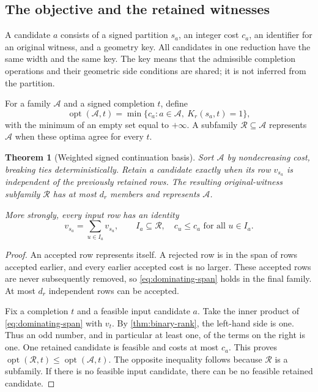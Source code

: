\documentclass[11pt,letterpaper]{article}
\newtheorem{theorem}{Theorem}[section]
\theoremstyle{definition}
\newcommand{\Opt}{\operatorname{opt}}
\begin{document}
\subsection{The objective and the retained witnesses}
A candidate $a$ consists of a signed partition $s_a$, an integer cost $c_a$, an identifier for an original witness, and a geometry key. All candidates in one reduction have the same width and the same key. The key means that the admissible completion operations and their geometric side conditions are shared; it is not inferred from the partition.

For a family $\mathcal A$ and a signed completion $t$, define
\[
 \Opt(\mathcal A,t)=\min\{c_a:a\in\mathcal A,\ K_r(s_a,t)=1\},
\]
with the minimum of an empty set equal to $+\infty$. A subfamily $\mathcal R\subseteq\mathcal A$ represents $\mathcal A$ when these optima agree for every $t$.

\begin{theorem}[Weighted signed continuation basis]\label{thm:weighted}
Sort $\mathcal A$ by nondecreasing cost, breaking ties deterministically. Retain a candidate exactly when its row $v_{s_a}$ is independent of the previously retained rows. The resulting original-witness subfamily $\mathcal R$ has at most $d_r$ members and represents $\mathcal A$.

More strongly, every input row has an identity
\begin{equation}\label{eq:dominating-span}
 v_{s_a}=\sum_{u\in I_a}v_{s_u},\qquad
 I_a\subseteq\mathcal R,\quad c_u\le c_a\text{ for all }u\in I_a.
\end{equation}
\end{theorem}
\begin{proof}
An accepted row represents itself. A rejected row is in the span of rows accepted earlier, and every earlier accepted cost is no larger. These accepted rows are never subsequently removed, so \eqref{eq:dominating-span} holds in the final family. At most $d_r$ independent rows can be accepted.

Fix a completion $t$ and a feasible input candidate $a$. Take the inner product of \eqref{eq:dominating-span} with $v_t$. By \cref{thm:binary-rank}, the left-hand side is one. Thus an odd number, and in particular at least one, of the terms on the right is one. One retained candidate is feasible and costs at most $c_a$. This proves $\Opt(\mathcal R,t)\le\Opt(\mathcal A,t)$. The opposite inequality follows because $\mathcal R$ is a subfamily. If there is no feasible input candidate, there can be no feasible retained candidate.
\end{proof}
\end{document}
